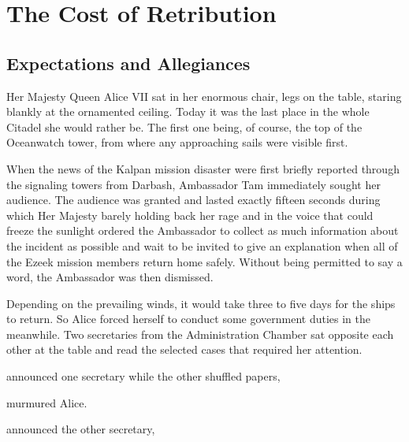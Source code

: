 \chapter{The Cost of Retribution}

\section{Expectations and Allegiances}

Her Majesty Queen Alice VII sat in her enormous chair, legs on the table, staring blankly at the ornamented ceiling. Today it was the last place in the whole Citadel she would rather be. The first one being, of course, the top of the Oceanwatch tower, from where any approaching sails were visible first.

When the news of the Kalpan mission disaster were first briefly reported through the signaling towers from Darbash, Ambassador Tam immediately sought her audience. The audience was granted and lasted exactly fifteen seconds during which Her Majesty barely holding back her rage and in the voice that could freeze the sunlight ordered the Ambassador to collect as much information about the incident as possible and wait to be invited to give an explanation when all of the Ezeek mission members return home safely. Without being permitted to say a word, the Ambassador was then dismissed.

Depending on the prevailing winds, it would take three to five days for the ships to return. So Alice forced herself to conduct some government duties in the meanwhile. Two secretaries from the Administration Chamber sat opposite each other at the table and read the selected cases that required her attention.

 announced one secretary while the other shuffled papers, 

 murmured Alice.

 announced the other secretary, 


